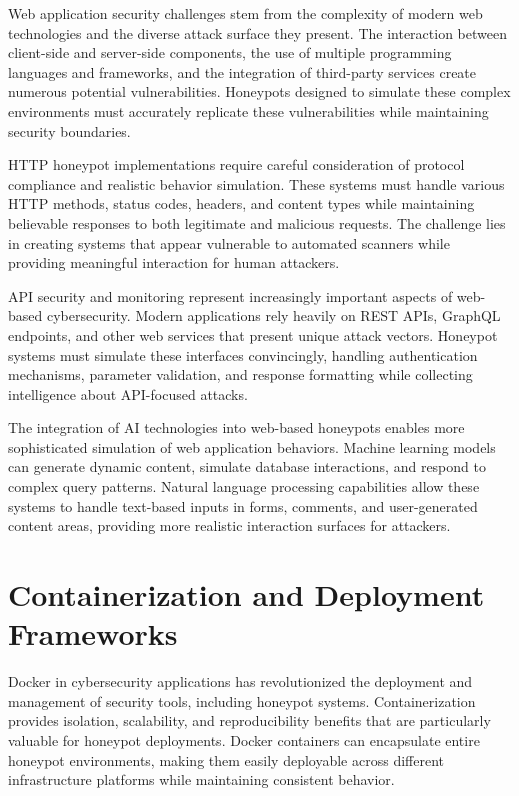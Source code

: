 Web application security challenges stem from the complexity of modern web technologies and the diverse attack surface they present. The interaction between client-side and server-side components, the use of multiple programming languages and frameworks, and the integration of third-party services create numerous potential vulnerabilities. Honeypots designed to simulate these complex environments must accurately replicate these vulnerabilities while maintaining security boundaries.

HTTP honeypot implementations require careful consideration of protocol compliance and realistic behavior simulation. These systems must handle various HTTP methods, status codes, headers, and content types while maintaining believable responses to both legitimate and malicious requests. The challenge lies in creating systems that appear vulnerable to automated scanners while providing meaningful interaction for human attackers.

API security and monitoring represent increasingly important aspects of web-based cybersecurity. Modern applications rely heavily on REST APIs, GraphQL endpoints, and other web services that present unique attack vectors. Honeypot systems must simulate these interfaces convincingly, handling authentication mechanisms, parameter validation, and response formatting while collecting intelligence about API-focused attacks.

The integration of AI technologies into web-based honeypots enables more sophisticated simulation of web application behaviors. Machine learning models can generate dynamic content, simulate database interactions, and respond to complex query patterns. Natural language processing capabilities allow these systems to handle text-based inputs in forms, comments, and user-generated content areas, providing more realistic interaction surfaces for attackers.

\section{Containerization and Deployment Frameworks}

Docker in cybersecurity applications has revolutionized the deployment and management of security tools, including honeypot systems. Containerization provides isolation, scalability, and reproducibility benefits that are particularly valuable for honeypot deployments. Docker containers can encapsulate entire honeypot environments, making them easily deployable across different infrastructure platforms while maintaining consistent behavior.

